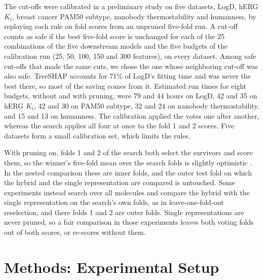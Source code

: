 The cut-offs were calibrated in a preliminary study on five datasets, LogD, hERG $K_i$, breast cancer PAM50 subtype, nanobody thermostability and humanness, by replaying each rule on fold scores from an unpruned five-fold run. A cut-off counts as safe if the best five-fold score is unchanged for each of the 25 combinations of the five downstream models and the five budgets of the calibration run (25, 50, 100, 150 and 300 features), on every dataset. Among safe cut-offs that made the same cuts, we chose the one whose neighboring cut-off was also safe. TreeSHAP accounts for 71\% of LogD's fitting time and was never the best there, so most of the saving comes from it. Estimated run times for eight budgets, without and with pruning, were 79 and 44 hours on LogD, 42 and 35 on hERG $K_i$, 42 and 30 on PAM50 subtype, 32 and 24 on nanobody thermostability, and 15 and 13 on humanness. The calibration applied the votes one after another, whereas the search applies all four at once to the fold 1 and 2 scores. Five datasets form a small calibration set, which limits the rules.

With pruning on, folds 1 and 2 of the search both select the survivors and score them, so the winner's five-fold mean over the search folds is slightly optimistic \citep{Cawley2010}. In the nested comparison these are inner folds, and the outer test fold on which the hybrid and the single representation are compared is untouched. Some experiments instead search over all molecules and compare the hybrid with the single representation on the search's own folds, as in leave-one-fold-out reselection, and there folds 1 and 2 are outer folds. Single representations are never pruned, so a fair comparison in those experiments leaves both voting folds out of both scores, or re-scores without them.

\section{Methods: Experimental Setup}

